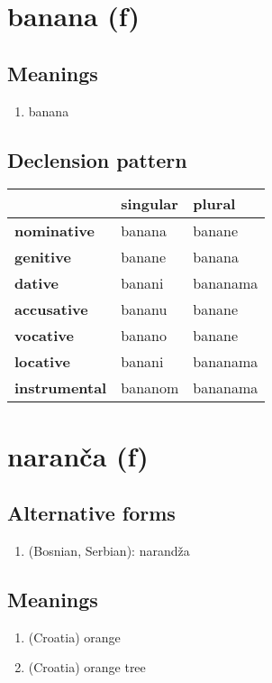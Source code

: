 \filbreak
\section{banana (f)}
\subsection*{Meanings}
\begin{enumerate}
\item banana
\end{enumerate}
\subsection*{Declension pattern}
\begin{tabularx}{\linewidth}{Xll}
\toprule
{} & singular &    plural \\
\midrule
\textbf{nominative  } &   banana &    banane \\
\textbf{genitive    } &   banane &    banana \\
\textbf{dative      } &   banani &  bananama \\
\textbf{accusative  } &   bananu &    banane \\
\textbf{vocative    } &   banano &    banane \\
\textbf{locative    } &   banani &  bananama \\
\textbf{instrumental} &  bananom &  bananama \\
\bottomrule
\end{tabularx}

\filbreak
\section{naranča (f)}
\subsection*{Alternative forms}
\begin{enumerate}
\item (Bosnian, Serbian): narandža
\end{enumerate}
\subsection*{Meanings}
\begin{enumerate}
\item (Croatia) orange
\item (Croatia) orange tree
\end{enumerate}
